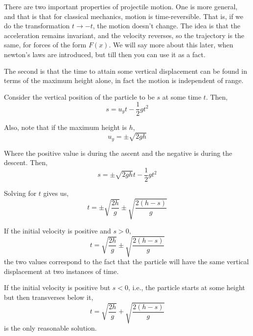     There are two important properties of projectile motion. One is more general, and that is that for 
    classical mechanics, motion is time-reversible. That is, if we do the transformation $t \to -t$, the motion 
    doesn't change. The idea is that the acceleration remains invariant, and the velocity reverses, so the trajectory 
    is the same, for forces of the form $F(x)$. We will say more about this later, when newton's laws are introduced, but 
    till then you can use it as a fact.

    The second is that the time to attain some vertical displacement can be found in terms of the maximum height alone,
    in fact the motion is independent of range. 

    Consider the vertical position of the particle to be $s$ at some time $t$. Then,
    \begin{equation*}
        s = u_y t - \frac{1}{2}gt^2
    \end{equation*}

    Also, note that if the maximum height is $h$,
    \begin{equation*}
        u_y = \pm \sqrt{2gh}
    \end{equation*}

    Where the positive value is during the ascent and the negative is during the descent. Then,
    \begin{equation*}
        s = \pm \sqrt{2gh}t - \frac{1}{2}gt^2
    \end{equation*}

    Solving for $t$ gives us,
    \begin{equation}
        t = \pm \sqrt{\frac{2h}{g}} \pm \sqrt{\frac{2(h - s)}{g}}
    \end{equation}

    If the initial velocity is positive and $s > 0$,
    \begin{equation}
        t = \sqrt{\frac{2h}{g}} \pm \sqrt{\frac{2(h - s)}{g}} 
    \end{equation}
    the two values correspond to the fact that the particle will have the same vertical displacement at two instances of time.

    If the initial velocity is positive but $s < 0$, i.e., the particle starts at some height but then transverses below it,
    \begin{equation}
        t = \sqrt{\frac{2h}{g}} + \sqrt{\frac{2(h - s)}{g}} 
    \end{equation}
    is the only reasonable solution.

